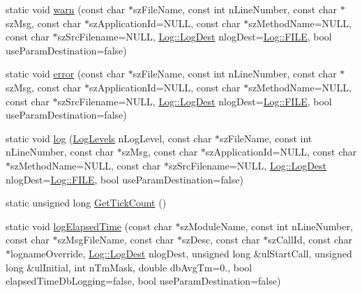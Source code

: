 \begin{DoxyCompactItemize}
\item 
static void \hyperlink{classutils_1_1Log_aaff384f2d48d78b72b9c5e72ebed18db}{warn} (const char $\ast$sz\+File\+Name, const int n\+Line\+Number, const char $\ast$sz\+Msg, const char $\ast$sz\+Application\+Id=N\+U\+LL, const char $\ast$sz\+Method\+Name=N\+U\+LL, const char $\ast$sz\+Src\+Filename=N\+U\+LL, \hyperlink{classutils_1_1Log_aa77064096777fe92d4ff8f6d68d42d5a}{Log\+::\+Log\+Dest} nlog\+Dest=\hyperlink{classutils_1_1Log_aa77064096777fe92d4ff8f6d68d42d5aaa4c1e78fb35ae098bba52e43e2a5e0e5}{Log\+::\+F\+I\+LE}, bool use\+Param\+Destination=false)
\item 
static void \hyperlink{classutils_1_1Log_a79149fab5ab512aef26dbebc45e936d1}{error} (const char $\ast$sz\+File\+Name, const int n\+Line\+Number, const char $\ast$sz\+Msg, const char $\ast$sz\+Application\+Id=N\+U\+LL, const char $\ast$sz\+Method\+Name=N\+U\+LL, const char $\ast$sz\+Src\+Filename=N\+U\+LL, \hyperlink{classutils_1_1Log_aa77064096777fe92d4ff8f6d68d42d5a}{Log\+::\+Log\+Dest} nlog\+Dest=\hyperlink{classutils_1_1Log_aa77064096777fe92d4ff8f6d68d42d5aaa4c1e78fb35ae098bba52e43e2a5e0e5}{Log\+::\+F\+I\+LE}, bool use\+Param\+Destination=false)
\item 
static void \hyperlink{classutils_1_1Log_ae5616599185aa1a607c838caa150f760}{log} (\hyperlink{classutils_1_1Log_a8f981afda2b7802a6e9ca4aac269d54a}{Log\+Levels} n\+Log\+Level, const char $\ast$sz\+File\+Name, const int n\+Line\+Number, const char $\ast$sz\+Msg, const char $\ast$sz\+Application\+Id=N\+U\+LL, const char $\ast$sz\+Method\+Name=N\+U\+LL, const char $\ast$sz\+Src\+Filename=N\+U\+LL, \hyperlink{classutils_1_1Log_aa77064096777fe92d4ff8f6d68d42d5a}{Log\+::\+Log\+Dest} nlog\+Dest=\hyperlink{classutils_1_1Log_aa77064096777fe92d4ff8f6d68d42d5aaa4c1e78fb35ae098bba52e43e2a5e0e5}{Log\+::\+F\+I\+LE}, bool use\+Param\+Destination=false)
\item 
static unsigned long \hyperlink{classutils_1_1Log_ae8791e18abf55ade26b8bcbae0921eaf}{Get\+Tick\+Count} ()
\item 
static void \hyperlink{classutils_1_1Log_a3288f62f0edee03354f3c258aabccae3}{log\+Elapsed\+Time} (const char $\ast$sz\+Module\+Name, const int n\+Line\+Number, const char $\ast$sz\+Msg\+File\+Name, const char $\ast$sz\+Desc, const char $\ast$sz\+Call\+Id, const char $\ast$logname\+Override, \hyperlink{classutils_1_1Log_aa77064096777fe92d4ff8f6d68d42d5a}{Log\+::\+Log\+Dest} nlog\+Dest, unsigned long \&ul\+Start\+Call, unsigned long \&ul\+Initial, int n\+Tm\+Mask, double db\+Avg\+Tm=0., bool elapsed\+Time\+Db\+Logging=false, bool use\+Param\+Destination=false)

\end{DoxyCompactItemize}
